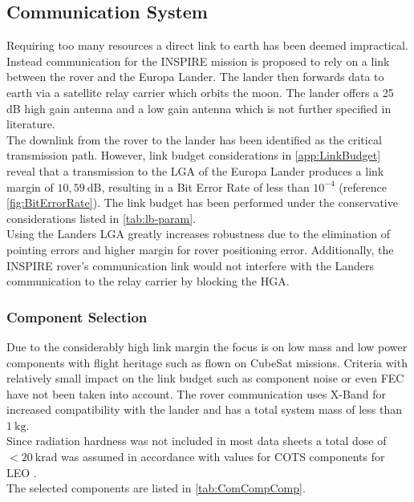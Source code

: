 \subsection{Communication System}
Requiring too many resources a direct link to earth has been deemed impractical. Instead communication for the INSPIRE mission is proposed to rely on a link between the rover and the Europa Lander. The lander then forwards data to earth via a satellite relay carrier which orbits the moon. The lander offers a 25 dB high gain antenna \cite{Lander_HGA} and a low gain antenna which is not further specified in literature.\\

The downlink from the rover to the lander has been identified as the critical transmission path. However, link budget considerations in \autoref{app:LinkBudget} reveal that a transmission to the LGA of the Europa Lander produces a link margin of $10,59~\text{dB}$, resulting in a Bit Error Rate of less than $10^{-4}$ (reference \autoref{fig:BitErrorRate}). The link budget has been performed under the conservative considerations listed in \autoref{tab:lb-param}.\\

Using the Landers LGA greatly increases robustness due to the elimination of pointing errors and higher margin for rover positioning error. Additionally, the INSPIRE rover’s communication link would not interfere with the Landers communication to the relay carrier by blocking the HGA.

\subsubsection{Component Selection}

Due to the considerably high link margin the focus is on low mass and low power components with flight heritage such as flown on CubeSat missions. Criteria with relatively small impact on the link budget such as component noise or even FEC have not been taken into account. The rover communication uses X-Band for increased compatibility with the lander and has a total system mass of less than $1~\text{kg}$. \\
Since radiation hardness was not included in most data sheets a total dose of $<20~\text{krad}$ was assumed in accordance with values for COTS components for LEO \cite{COTS_Rad}. \\

The selected components are listed in \autoref{tab:ComCompComp}. 

